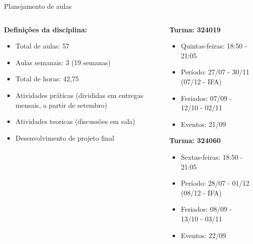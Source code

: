\documentclass{beamer}
\begin{document}
\begin{frame}[fragile]{Planejamento de aulas}
      \begin{columns}
            \begin{column}{0.5\textwidth}
                  \textbf{Definições da disciplina:}
                  \begin{itemize}
                        \item Total de aulas: 57 
                        \item Aulas semanais: 3 (19 semanas)
                        \item Total de horas: 42,75
                        \item Atividades práticas (divididas em entregas mensais, a partir de setembro)
                        \item Atividades teoricas (discussões em sala)
                        \item Desenvolvimento de projeto final
      
                  \end{itemize}


            \end{column}
            \begin{column}{0.5\textwidth}
                 \textbf{Turma: 324019}
                  \begin{itemize}
                        \item Quintas-feiras: 18:50 - 21:05
                        \item Período: 27/07 - 30/11 (07/12 - IFA)
                        \item Feriados: 07/09 - 12/10 - 02/11
                        \item Eventos: 21/09
                  \end{itemize}
                  \textbf{Turma: 324060}
                  \begin{itemize}
                        \item Sextas-feiras: 18:50 - 21:05
                        \item Período: 28/07 - 01/12 (08/12 - IFA)
                        \item Feriados: 08/09 - 13/10 - 03/11
                        \item Eventos: 22/09
                  \end{itemize}
            \end{column}
      \end{columns}
\end{frame}
\end{document}
